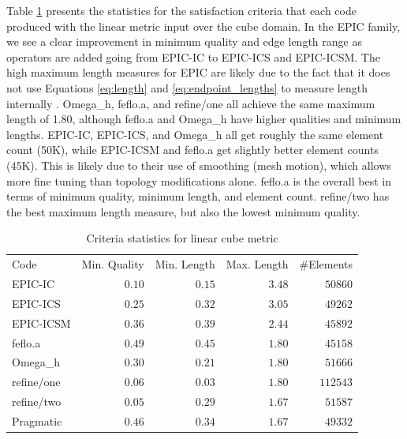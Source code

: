 \documentclass[3p,times,procedia,number]{elsarticle}
\begin{document}
Table \ref{tab:cube-linear-stats} presents the statistics
for the satisfaction criteria that each code
produced with the linear metric input over the cube domain.
In the EPIC family, we see a clear improvement in minimum
quality and edge length range as operators are added
going from EPIC-IC to EPIC-ICS and EPIC-ICSM.
The high maximum length measures for EPIC are likely due
to the fact that it does not use Equations \ref{eq:length}
and \ref{eq:endpoint_lengths} to measure length
internally \cite{park-loseille-krakos-michal-adapt-decomposition}.
Omega\_h, feflo.a, and refine/one
all achieve the same maximum length of 1.80, although
feflo.a and Omega\_h have higher qualities
and minimum lengths.
EPIC-IC, EPIC-ICS, and Omega\_h all get roughly
the same element count (50K), while EPIC-ICSM and feflo.a
get slightly better element counts (45K).
This is likely due to their use of smoothing (mesh motion),
which allows more fine tuning than topology modifications alone.
feflo.a is the overall best in terms of minimum
quality,
minimum length, and element count.
refine/two has the best maximum length measure,
but also the lowest minimum quality.

\begin{table}
\caption{Criteria statistics for linear cube metric}
\label{tab:cube-linear-stats}
\begin{tabular}{lrrrr}
Code & Min. Quality & Min. Length & Max. Length & \#Elements\\
EPIC-IC     & $0.10$&       $0.15$&       $3.48$&   $ 50860$\\
EPIC-ICS    & $0.25$&       $0.32$&       $3.05$&   $ 49262$\\
EPIC-ICSM   & $0.36$&       $0.39$&       $2.44$&   $ 45892$\\
feflo.a     & $0.49$&       $0.45$&       $1.80$&   $ 45158$\\
Omega\_h    & $0.30$&       $0.21$&       $1.80$&   $ 51666$\\
refine/one  & $0.06$&       $0.03$&       $1.80$&   $112543$\\
refine/two  & $0.05$&       $0.29$&       $1.67$&   $ 51587$\\
Pragmatic   & $0.46$&       $0.34$&       $1.67$&   $ 49332$\\
\end{tabular}
\end{table}
\end{document}
